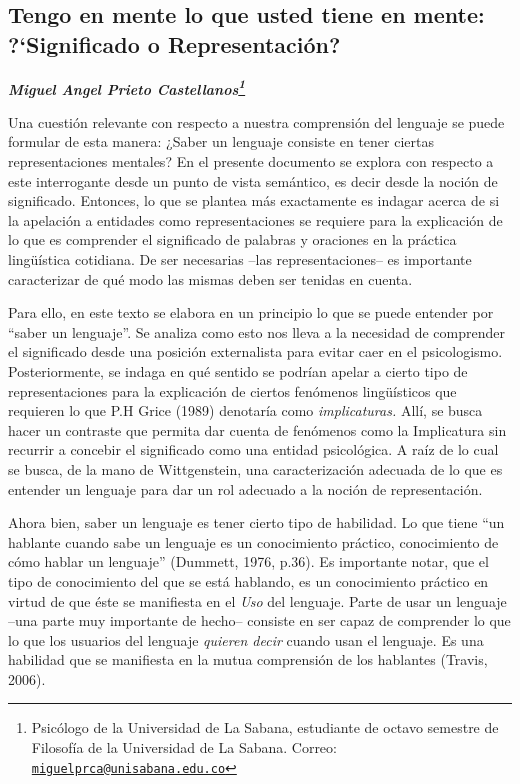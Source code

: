 \documentclass[]{book}
\newcommand{\autor}[1]{            %
  \begin{center}                   %
    \vspace*{-3.5em}               %
    \textbf{\textit{\large #1}}    %
    \vspace*{+4em}                 %
  \end{center}
}
\begin{document}
\begin{refsection}
\chapter{\texorpdfstring{\textbf{Tengo en mente lo que usted tiene en
mente: ?`Significado o
Representación?}}{Tengo en mente lo que usted tiene en mente: ?`Significado o Representación?}}\label{tengo-en-mente-lo-que-usted-tiene-en-mente-significado-o-representaciuxf3n}

\autor{Miguel Angel Prieto Castellanos\footnote{Psicólogo de la
  Universidad de La Sabana, estudiante de octavo semestre de Filosofía
  de la Universidad de La Sabana. Correo:
  \href{mailto:miguelprca@unisabana.edu.co}{\nolinkurl{miguelprca@unisabana.edu.co}}}}

Una cuestión relevante con respecto a nuestra comprensión del lenguaje
se puede formular de esta manera: ¿Saber un lenguaje consiste en tener
ciertas representaciones mentales? En el presente documento se explora
con respecto a este interrogante desde un punto de vista semántico, es
decir desde la noción de significado. Entonces, lo que se plantea más
exactamente es indagar acerca de si la apelación a entidades como
representaciones se requiere para la explicación de lo que es comprender
el significado de palabras y oraciones en la práctica lingüística
cotidiana. De ser necesarias --las representaciones-- es importante
caracterizar de qué modo las mismas deben ser tenidas en cuenta.

Para ello, en este texto se elabora en un principio lo que se puede
entender por ``saber un lenguaje''. Se analiza como esto nos lleva a la
necesidad de comprender el significado desde una posición externalista
para evitar caer en el psicologismo. Posteriormente, se indaga en qué
sentido se podrían apelar a cierto tipo de representaciones para la
explicación de ciertos fenómenos lingüísticos que requieren lo que P.H
Grice (1989) denotaría como \emph{implicaturas.} Allí, se busca hacer un
contraste que permita dar cuenta de fenómenos como la Implicatura sin
recurrir a concebir el significado como una entidad psicológica. A raíz
de lo cual se busca, de la mano de Wittgenstein, una caracterización
adecuada de lo que es entender un lenguaje para dar un rol adecuado a la
noción de representación.

Ahora bien, saber un lenguaje es tener cierto tipo de habilidad. Lo que
tiene ``un hablante cuando sabe un lenguaje es un conocimiento práctico,
conocimiento de cómo hablar un lenguaje'' (Dummett, 1976, p.36). Es
importante notar, que el tipo de conocimiento del que se está hablando,
es un conocimiento práctico en virtud de que éste se manifiesta en el
\emph{Uso} del lenguaje. Parte de usar un lenguaje --una parte muy
importante de hecho-- consiste en ser capaz de comprender lo que lo que
los usuarios del lenguaje \emph{quieren decir} cuando usan el lenguaje.
Es una habilidad que se manifiesta en la mutua comprensión de los
hablantes (Travis, 2006).


\end{refsection}
\end{document}
